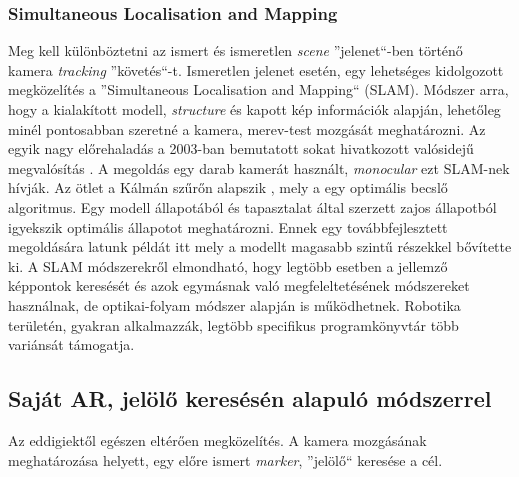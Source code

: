 \documentclass[12pt,a4paper,oneside]{report} %
\begin{document}
\subsubsection{Simultaneous Localisation and Mapping}
Meg kell különböztetni az ismert és ismeretlen \textit{scene} ''jelenet``-ben történő kamera \textit{tracking} ''követés``-t. Ismeretlen jelenet esetén, egy lehetséges kidolgozott megközelítés a ''Simultaneous Localisation and Mapping`` (SLAM). Módszer arra, hogy a kialakított modell, \textit{structure} és kapott kép információk alapján, lehetőleg minél pontosabban szeretné a kamera, merev-test mozgását meghatározni.
Az egyik nagy előrehaladás a 2003-ban bemutatott sokat hivatkozott valósidejű megvalósítás \cite{davison2003real}. A megoldás egy darab kamerát használt, \textit{monocular} ezt SLAM-nek hívják. 
Az ötlet a Kálmán szűrőn alapszik \cite{welch1995introduction}, mely a egy optimális becslő algoritmus. Egy modell állapotából és tapasztalat által szerzett zajos állapotból igyekszik optimális állapotot meghatározni. Ennek egy továbbfejlesztett megoldására latunk példát itt \cite{klein2008improving} mely a modellt magasabb szintű részekkel bővítette ki. A SLAM módszerekről elmondható, hogy legtöbb esetben a jellemző képpontok keresését és azok egymásnak való megfeleltetésének módszereket használnak, de optikai-folyam módszer alapján is működhetnek. 
Robotika területén, gyakran alkalmazzák, legtöbb specifikus programkönyvtár több variánsát támogatja.

\subsection{Saját AR, jelölő keresésén alapuló módszerrel}
Az eddigiektől egészen eltérően megközelítés. A kamera mozgásának meghatározása helyett, egy előre ismert \textit{marker}, ''jelölő``  keresése a cél. 
\end{document}
